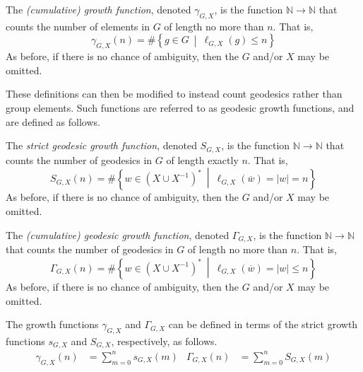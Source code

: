 \begin{definition}
	\label{def:cumulativeGrowth}
	The \emph{(cumulative) growth function}, denoted $\gamma_{G,X}$, is the function $\mathbb{N} \to \mathbb{N}$ that counts the number of elements in $G$ of length no more than $n$.
	That is,
	\[
		\gamma_{G,X}(n)
		=
		\#
		\left\lbrace
		g \in G
		\ \middle\vert\ 
		\ell_{G,X}(g) \leq n
		\right\rbrace
	\]
	As before, if there is no chance of ambiguity, then the $G$ and/or $X$ may be omitted.
	\thmendmark
\end{definition}

These definitions can then be modified to instead count geodesics rather than group elements.
Such functions are referred to as geodesic growth functions, and are defined as follows.

\begin{definition}
	\label{def:strictGeodGrowth}
	The \emph{strict geodesic growth function}, denoted $S_{G,X}$, is the function $\mathbb{N} \to \mathbb{N}$ that counts the number of geodesics in $G$ of length exactly $n$.
	That is,
	\[
	S_{G,X}(n)
	=
	\#
	\left\lbrace
	w \in \left(X \cup X^{-1}\right)^\ast
	\ \middle\vert\ 
	\ell_{G,X}(\overline{w}) = \left\vert w \right\vert = n
	\right\rbrace
	\]
	As before, if there is no chance of ambiguity, then the $G$ and/or $X$ may be omitted.
\end{definition}

\begin{definition}
	\label{def:cumulativeGeodGrowth}
	The \emph{(cumulative) geodesic growth function}, denoted $\Gamma_{G,X}$, is the function $\mathbb{N} \to \mathbb{N}$ that counts the number of geodesics in $G$ of length no more than $n$.
	That is,
	\[
	\Gamma_{G,X}(n)
	=
	\#
	\left\lbrace
	w \in \left(X \cup X^{-1}\right)^\ast
	\ \middle\vert\ 
	\ell_{G,X}(\overline{w}) = \left\vert w \right\vert \leq n
	\right\rbrace
	\]
	As before, if there is no chance of ambiguity,  then the $G$ and/or $X$ may be omitted.
\end{definition}

\begin{remark}
	The growth functions $\gamma_{G,X}$ and $\Gamma_{G,X}$ can be defined in terms of the strict growth functions $s_{G,X}$ and $S_{G,X}$, respectively, as follows.
	\begin{align*}
		\gamma_{G,X}(n) &= \sum_{m=0}^n s_{G,X}(m)
		&
		\Gamma_{G,X}(n) &= \sum_{m=0}^n S_{G,X}(m)
	\end{align*}
	\thmendmark
\end{remark}

